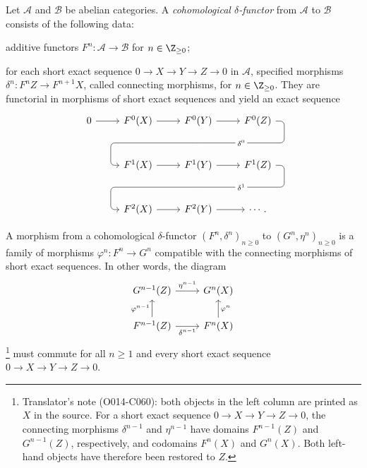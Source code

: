 \begin{definition}\label{def:delta-functor}
	Let $\mathcal{A}$ and $\mathcal{B}$ be abelian categories. A
	\emph{cohomological $\delta$-functor} from $\mathcal{A}$ to $\mathcal{B}$
	consists of the following data:
	\begin{compactitem}
		\item additive functors $F^n:\mathcal{A}\to\mathcal{B}$ for
		$n\in\Z_{\geq0}$;
		\item for each short exact sequence $0\to X\to Y\to Z\to0$ in
		$\mathcal{A}$, specified morphisms $\delta^n:F^nZ\to F^{n+1}X$,
		called connecting morphisms, for $n\in\Z_{\geq0}$. They are
		functorial in morphisms of short exact sequences and yield an exact
		sequence
		\begin{equation*}\begin{tikzcd}[row sep=large]
			0 \arrow[r] & F^0(X) \arrow[r] & F^0(Y) \arrow[r] \arrow[phantom, d, ""{coordinate, name=A}] & F^0(Z) \arrow[dll, rounded corners, "{\delta^0}" description, to path={
				-- ([xshift=2ex]\tikztostart.east)
				|- (A) [near end]\tikztonodes
				-| ([xshift=-2ex]\tikztotarget.west)
				-- (\tikztotarget)}] \\
			& F^1(X) \arrow[r] & F^1(Y) \arrow[r] \arrow[phantom, d, ""{coordinate, name=B}] & F^1(Z) \arrow[dll, rounded corners, "{\delta^1}" description, to path={
				-- ([xshift=2ex]\tikztostart.east)
				|- (B) [near end]\tikztonodes
				-| ([xshift=-2ex]\tikztotarget.west)
				-- (\tikztotarget)}] \\
			& F^2(X) \arrow[r] & F^2(Y) \arrow[r] & \cdots .
		\end{tikzcd}\end{equation*}
	\end{compactitem}
	A morphism from a cohomological $\delta$-functor
	$(F^n,\delta^n)_{n\geq0}$ to $(G^n,\eta^n)_{n\geq0}$ is a family of
	morphisms $\varphi^n:F^n\to G^n$ compatible with the connecting morphisms
	of short exact sequences. In other words, the diagram
	\[\begin{tikzcd}
		G^{n-1} (Z) \arrow[r, "{\eta^{n-1}}"] & G^n (X) \\
		F^{n-1} (Z) \arrow[r, "{\delta^{n-1}}"'] \arrow[u, "{\varphi^{n-1}}"] & F^n (X) \arrow[u, "\varphi^n"']
	\end{tikzcd}\]%
	\footnote{Translator's note (O014-C060): both objects in the left column
	are printed as $X$ in the source. For a short exact sequence
	$0\to X\to Y\to Z\to0$, the connecting morphisms $\delta^{n-1}$ and
	$\eta^{n-1}$ have domains $F^{n-1}(Z)$ and $G^{n-1}(Z)$, respectively,
	and codomains $F^n(X)$ and $G^n(X)$. Both left-hand objects have therefore
	been restored to $Z$.}
	must commute for all $n\geq1$ and every short exact sequence
	$0\to X\to Y\to Z\to0$.


\end{definition}
